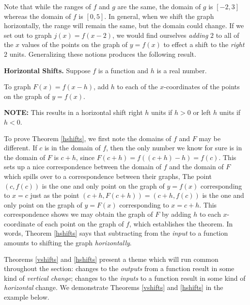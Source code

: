 \documentclass{ximera}
\begin{document}
Note that while the ranges of $f$ and $g$ are the same, the domain of $g$ is $[-2,3]$ whereas the domain of $f$ is $[0,5]$.  In general, when we shift the graph horizontally, the range will remain the same, but the domain could change.  If we set out to graph $j(x) = f(x-2)$, we would find ourselves \textit{adding} $2$ to all of the $x$ values of the points on the graph of $y=f(x)$ to effect a shift to the \emph{right} $2$ units. Generalizing these notions produces the following result.

\smallskip

\colorbox{ResultColor}{\bbm


\begin{theorem} \label{hshifts}\textbf{Horizontal Shifts.}  Suppose $f$ is a function and $h$ is a real number. 

To graph $F(x) = f(x-h)$,  add $h$ to each of the $x$-coordinates of the points on the graph of $y=f(x)$.

\textbf{NOTE:}  This results in a horizontal shift right $h$ units if $h > 0$ or left $h$ units if $h< 0$.

\end{theorem}

\ebm}

\smallskip

To prove Theorem \ref{hshifts}, we first note the domains of $f$ and $F$ may be different.   If $c$ is in the domain of $f$, then the only number we know for sure is in the domain of $F$ is  $c+h$, since $F(c+h) = f((c+h)-h) = f(c)$.  This sets up a nice correspondence between the domain of $f$ and the domain of $F$ which spills over to a correspondence between their graphs,  The point $(c, f(c))$ is the one and only point on the graph of $y = f(x)$ corresponding to $x=c$ just as the point $(c+h, F(c+h)) = (c+h, f(c))$ is the one and only point on the graph of $y = F(x)$ corresponding to $x=c+h$.  This correspondence shows we may obtain the graph of $F$ by adding $h$ to each $x$-coordinate of each point on the graph of $f$, which establishes the theorem. In words, Theorem \ref{hshifts} says that subtracting from the  \textit{input} to a function amounts to shifting the graph \textit{horizontally}. 

\smallskip

 Theorems \ref{vshifts} and \ref{hshifts} present a theme which will run common throughout the section:  changes to the \textit{outputs} from a function result in some kind of \textit{vertical change};  changes to the \textit{inputs} to a function result in some kind of \textit{horizontal} change.  We demonstrate  Theorems \ref{vshifts} and \ref{hshifts} in the example below.
 
\end{document}
